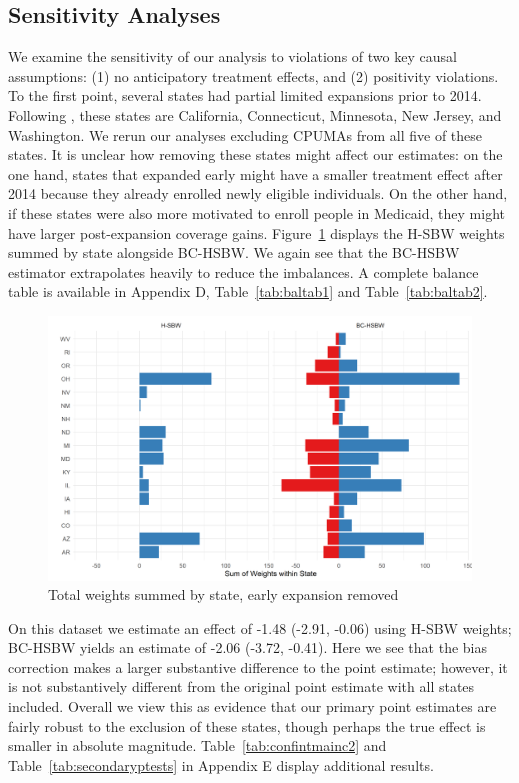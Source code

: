 \documentclass[aoas]{imsart}
\theoremstyle{plain}
\theoremstyle{remark}
\begin{document}
\subsection{Sensitivity Analyses} \label{sssec:sensitivity}

We examine the sensitivity of our analysis to violations of two key causal assumptions: (1) no anticipatory treatment effects, and (2) positivity violations. To the first point, several states had partial limited expansions prior to 2014. Following \cite{frean2017premium}, these states are California, Connecticut, Minnesota, New Jersey, and Washington. We rerun our analyses excluding CPUMAs from all five of these states. It is unclear how removing these states might affect our estimates: on the one hand, states that expanded early might have a smaller treatment effect after 2014 because they already enrolled newly eligible individuals. On the other hand, if these states were also more motivated to enroll people in Medicaid, they might have larger post-expansion coverage gains. Figure~\ref{fig:weightsbystatec2} displays the H-SBW weights summed by state alongside BC-HSBW. We again see that the BC-HSBW estimator extrapolates heavily to reduce the imbalances. A complete balance table is available in Appendix D, Table~\ref{tab:baltab1} and Table~\ref{tab:baltab2}.

\begin{figure}
\begin{center}
    \caption{Total weights summed by state, early expansion removed}
    \label{fig:weightsbystatec2}
    \includegraphics[scale=0.6]{01_Plots/weights-by-state-hsbw-c2.png}
\end{center}
\end{figure}

On this dataset we estimate an effect of -1.48 (-2.91, -0.06) using H-SBW weights; BC-HSBW yields an estimate of -2.06 (-3.72, -0.41). Here we see that the bias correction makes a larger substantive difference to the point estimate; however, it is not substantively different from the original point estimate with all states included. Overall we view this as evidence that our primary point estimates are fairly robust to the exclusion of these states, though perhaps the true effect is smaller in absolute magnitude. Table~\ref{tab:confintmainc2} and Table~\ref{tab:secondaryptests} in Appendix E display additional results. 
\end{document}
